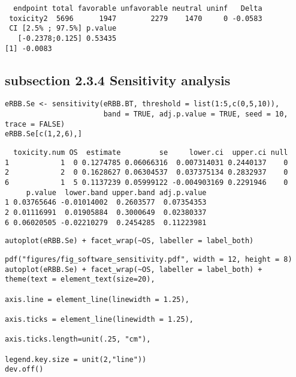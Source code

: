 \documentclass[12pt]{article}
\begin{document}
\begin{verbatim}
  endpoint total favorable unfavorable neutral uninf   Delta
 toxicity2  5696      1947        2279    1470     0 -0.0583
 CI [2.5% ; 97.5%] p.value
   [-0.2378;0.125] 0.53435
[1] -0.0083
\end{verbatim}

\subsection{subsection 2.3.4 Sensitivity analysis}
\label{sec:orge51effc}

\lstset{language=r,label= ,caption= ,captionpos=b,numbers=none}
\begin{lstlisting}
eRBB.Se <- sensitivity(eRBB.BT, threshold = list(1:5,c(0,5,10)),
                       band = TRUE, adj.p.value = TRUE, seed = 10, trace = FALSE)
eRBB.Se[c(1,2,6),]
\end{lstlisting}

\begin{verbatim}
  toxicity.num OS  estimate         se     lower.ci  upper.ci null
1            1  0 0.1274785 0.06066316  0.007314031 0.2440137    0
2            2  0 0.1628627 0.06304537  0.037375134 0.2832937    0
6            1  5 0.1137239 0.05999122 -0.004903169 0.2291946    0
     p.value  lower.band upper.band adj.p.value
1 0.03765646 -0.01014002  0.2603577  0.07354353
2 0.01116991  0.01905884  0.3000649  0.02380337
6 0.06020505 -0.02210279  0.2454285  0.11223981
\end{verbatim}


\lstset{language=r,label= ,caption= ,captionpos=b,numbers=none}
\begin{lstlisting}
autoplot(eRBB.Se) + facet_wrap(~OS, labeller = label_both)
\end{lstlisting}

\lstset{language=r,label= ,caption= ,captionpos=b,numbers=none}
\begin{lstlisting}
pdf("figures/fig_software_sensitivity.pdf", width = 12, height = 8)
autoplot(eRBB.Se) + facet_wrap(~OS, labeller = label_both) + theme(text = element_text(size=20), 
                                                                   axis.line = element_line(linewidth = 1.25),
                                                                   axis.ticks = element_line(linewidth = 1.25),
                                                                   axis.ticks.length=unit(.25, "cm"),
                                                                   legend.key.size = unit(2,"line"))
dev.off()
\end{lstlisting}
\end{document}
